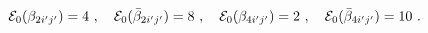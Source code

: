 \begin{equation}\label{eng6}
{\cal E}_0(\beta_{2i'j'}) = 4 ~,~~~
{\cal E}_0(\bar\beta_{2i'j'}) = 8 ~,~~~
{\cal E}_0(\beta_{4i'j'}) = 2 ~,~~~
{\cal E}_0(\bar\beta_{4i'j'}) = 10 ~.
\end{equation}

